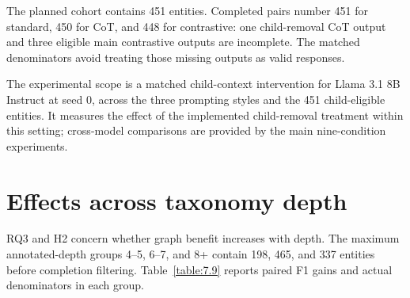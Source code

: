 The planned cohort contains 451 entities. Completed pairs number 451 for standard, 450 for CoT, and 448 for contrastive: one child-removal CoT output and three eligible main contrastive outputs are incomplete. The matched denominators avoid treating those missing outputs as valid responses.


The experimental scope is a matched child-context intervention for Llama 3.1 8B Instruct at seed 0, across the three prompting styles and the 451 child-eligible entities. It measures the effect of the implemented child-removal treatment within this setting; cross-model comparisons are provided by the main nine-condition experiments.


\FloatBarrier

\section{Effects across taxonomy depth}

RQ3 and H2 concern whether graph benefit increases with depth. The maximum annotated-depth groups 4–5, 6–7, and 8+ contain 198, 465, and 337 entities before completion filtering. Table~\ref{table:7.9} reports paired F1 gains and actual denominators in each group.


